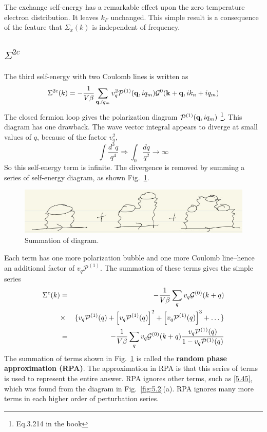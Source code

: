 The exchange self-energy has a remarkable effect upon the zero temperature electron distribution.
It leaves $k_F$ unchanged. This simple result is a consequence of the feature that $\Sigma_x(k)$ is independent of frequency.

\subsection{$\Sigma^{2c}$}
The third self-energy with two Coulomb lines is written as
\begin{equation}
    \Sigma^{2c}(k) = - \frac{1}{V\beta}  \sum_{\mathbf{q},iq_m} v_q^2 \mathcal{P}^{(1)}(\mathbf{q},iq_m) \mathcal{G}^0 (\mathbf{k}+ \mathbf{q},ik_n+iq_m)   \label{5.52}
\end{equation}
The closed fermion loop gives the polarization diagram $\mathcal{P}^{(1)}(\mathbf{q},iq_m)$ \footnote{Eq.3.214 in the book}.
This diagram has one drawback.
The wave vector integral appears to diverge at small values of $q$, because of the factor $v_q^2$,
\begin{equation}
    \int \frac{d^3 q}{q^4} \Longrightarrow \int_0 \frac{dq}{q^2} \to \infty \label{5.53}
\end{equation}
So this self-energy term is infinite.
The divergence is removed by summing a series of self-energy diagram, as shown Fig.~\ref{fig:5.3}.
\begin{figure}[ht]
    \centering
    \includegraphics[width=0.8\linewidth]{fig/fig5-3.jpg}
    \caption{Summation of diagram.}%
    \label{fig:5.3}
\end{figure}
Each term has one more polarization bubble and one more Coulomb line--hence an additional factor of $v_q\mathcal{P}^{(1)}$.
The summation of these terms gives the simple series
\begin{eqnarray}
    \Sigma^{c}(k) &=& - \frac{1}{V\beta}  \sum_q v_q \mathcal{G}^{(0)} (k+q) \nonumber \\
    &\times& \lbrace v_q \mathcal{P}^{(1)}(q) + \left[ v_q \mathcal{P}^{(1)}(q) \right]^2 + \left[ v_q \mathcal{P}^{(1)}(q) \right]^3 + \dots \rbrace \nonumber \\
    &=& - \frac{1}{V\beta} \sum_q v_q \mathcal{G}^{(0)}(k+q) \frac{v_q \mathcal{P}^{(1)}(q)}{1 - v_q \mathcal{P}^{(1)}(q)} \label{5.54}
\end{eqnarray}
The summation of terms shown in Fig.~\ref{fig:5.3} is called the \textbf{random phase approximation (RPA)}.
The approximation in RPA is that this series of terms is used to represent the entire answer.
RPA ignores other terms, such as \eqref{5.45}, which was found from the diagram in Fig.~\ref{fig:5.2}(a).
RPA ignores many more terms in each higher order of perturbation series.

